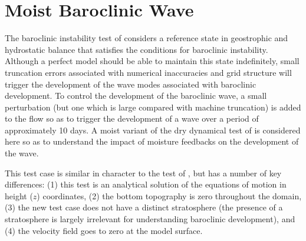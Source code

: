 \documentclass[times,doublespace]{fldauth}
\begin{document}

\clearpage
\section{Moist Baroclinic Wave} \label{sec:baroclinic_wave}
 
The baroclinic instability test of \cite{ullrich2014proposed} considers a reference state in geostrophic and hydrostatic balance that satisfies the conditions for baroclinic instability.  Although a perfect model should be able to maintain this state indefinitely, small truncation errors associated with numerical inaccuracies and grid structure will trigger the development of the wave modes associated with baroclinic development.  To control the development of the baroclinic wave, a small perturbation (but one which is large compared with machine truncation) is added to the flow so as to trigger the development of a wave over a period of approximately 10 days.  A moist variant of the dry dynamical test of \cite{ullrich2014proposed} is considered here so as to understand the impact of moisture feedbacks on the development of the wave.

This test case is similar in character to the test of \cite{jablonowski2006baroclinic}, but has a number of key differences:  (1) this test is an analytical solution of the equations of motion in height ($z$) coordinates, (2) the bottom topography is zero throughout the domain, (3) the new test case does not have a distinct stratosphere (the presence of a stratosphere is largely irrelevant for understanding baroclinic development), and (4) the velocity field goes to zero at the model surface.
 
\end{document}
